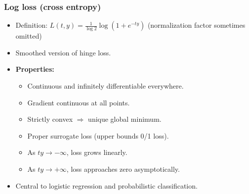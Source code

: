 \subsubsection*{Log loss (cross entropy)}
\begin{itemize}
    \item Definition: $L(t,y)=\frac{1}{\log 2}\log (1+e^{-ty})$ (normalization factor sometimes omitted)
    \item Smoothed version of hinge loss.
    \item \textbf{Properties:}
    \begin{itemize}
        \item Continuous and infinitely differentiable everywhere.
        \item Gradient continuous at all points.
        \item Strictly convex $\Rightarrow$ unique global minimum.
        \item Proper surrogate loss (upper bounds 0/1 loss).
        \item As $ty \to -\infty$, loss grows linearly.
        \item As $ty \to +\infty$, loss approaches zero asymptotically.
    \end{itemize}
    \item Central to logistic regression and probabilistic classification.
\end{itemize}

